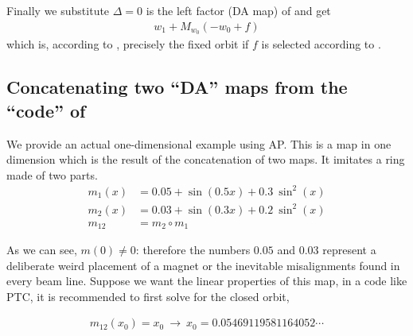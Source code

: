 \documentclass{hitec}     %
\begin{document}
{Finally we substitute $\Delta =0$ is the left factor (DA map) of  and get
%
\begin{align} {w}_{1}+{M}_{{w}_{0}}(-{w}_{0}+f)\nonumber 
\end{align}
which is, according to , precisely the fixed orbit if $f$ is selected according to . 

\subsection{Concatenating two ``DA'' maps from the ``code'' of }\label{s:exampleda}

We provide an actual one-dimensional example using AP. This is a map in one dimension which is the result of the concatenation of two maps. It imitates a ring made of two parts.  
%
\begin{align} {m}_{1}(x)&=0.05+\sin\left({0.5x}\right)+0.3\ {\sin}^{2}\left({x}\right)\nonumber \\
 {m}_{2}(x)&=0.03+\sin\left({0.3x}\right)+0.2\ {\sin}^{2}\left({x}\right)\nonumber \\
 {m}_{12}&={m}_{2}\circ {m}_{1}\label{eq:m12}\end{align}


As we can see, $m(0)\ne 0$: therefore the numbers $0.05$ and $0.03$  represent  a deliberate weird placement of a magnet or the inevitable misalignments found in every beam line.  Suppose we want the linear properties of this map, in a code like PTC, it is recommended to first solve for the closed orbit, 

%
\begin{align} m{}_{12}({x}_{0})=
{x}_{0}\ \rightarrow \ {x}_{0}=
0.05469119581164052\cdots\label{eq:m1t0}\end{align}


}
\end{document}
